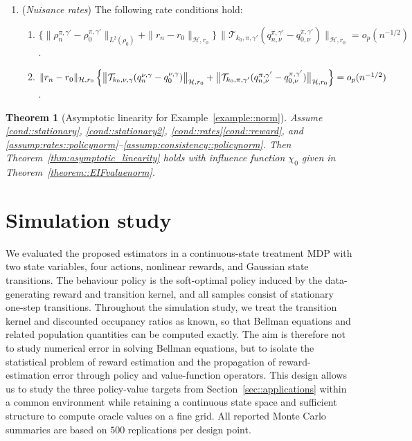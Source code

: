 \documentclass[12pt]{article}
\theoremstyle{plain}
\newtheorem{theorem}{Theorem}
\begin{document}
 


 

\begin{enumerate}[label=\textbf{(E\arabic***)}, ref=E\arabic***, series=efficiency2]
    \item \label{assump:rates::policynorm} (\textit{Nuisance rates})
    The following rate conditions hold:
    \begin{enumerate}[label=(\alph*)]
        \item
        \(\bigl\{\|\rho_n^{\pi,\gamma'}-\rho_0^{\pi,\gamma'}\|_{L^2(\rho_0)}
        +\|r_n-r_0\|_{\mathcal{H},r_0}\bigr\}\,
        \bigl\|\mathcal{T}_{k_0,\pi,\gamma'}
        (q_{n,\nu}^{\pi,\gamma'}-q_{0,\nu}^{\pi,\gamma'})\bigr\|_{\mathcal{H},r_0}
        =o_p(n^{-1/2})\).
        \item
        \(\|r_n-r_0\|_{\mathcal{H},r_0}\,
        \Bigl\{
        \bigl\|\mathcal{T}_{k_0,\nu,\gamma}(q_n^{\nu,\gamma}-q_0^{\nu,\gamma})\bigr\|_{\mathcal{H},r_0}
        +\bigl\|\mathcal{T}_{k_0,\pi,\gamma'}
        (q_{n,\nu}^{\pi,\gamma'}-q_{0,\nu}^{\pi,\gamma'})\bigr\|_{\mathcal{H},r_0}
        \Bigr\}
        =o_p(n^{-1/2})\).
    \end{enumerate}
\end{enumerate}



 
\begin{theorem}[Asymptotic linearity for Example~\ref{example::norm}]
\label{theorem::ALex2}
Assume \ref{cond::stationary}, \ref{cond::stationary2},
\ref{cond::rates}\ref{cond::reward}, and
\ref{assump:rates::policynorm}--\ref{assump:consistency::policynorm}.
Then Theorem~\ref{thm:asymptotic_linearity} holds with influence function
\(\chi_0\) given in Theorem~\ref{theorem::EIFvaluenorm}.
\end{theorem}




 
\section{Simulation study}
\label{sec:simulation}

We evaluated the proposed estimators in a continuous-state treatment MDP with
two state variables, four actions, nonlinear rewards, and Gaussian state
transitions. The behaviour policy is the soft-optimal policy induced by the
data-generating reward and transition kernel, and all samples consist of
stationary one-step transitions. Throughout the simulation study, we treat the
transition kernel and discounted occupancy ratios as known, so that Bellman
equations and related population quantities can be computed exactly. The aim is
therefore not to study numerical error in solving Bellman equations, but to
isolate the statistical problem of reward estimation and the propagation of
reward-estimation error through policy and value-function operators. This
design allows us to study the three policy-value targets from
Section~\ref{sec::applications} within a common environment while retaining a
continuous state space and sufficient structure to compute oracle values on a
fine grid. All reported Monte Carlo summaries are based on $500$ replications
per design point.
\end{document}
